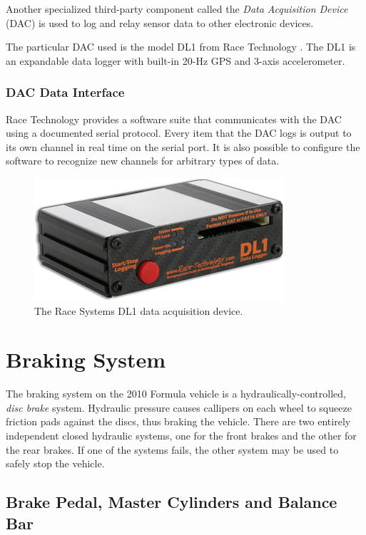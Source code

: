Another specialized third-party component called the \emph{Data Acquisition Device} (DAC) is used to log and relay sensor data to other electronic devices.

The particular DAC used is the model DL1 from Race Technology \cite{DL1Dsheet}. The DL1 is an expandable data logger with built-in 20-Hz GPS and 3-axis accelerometer.

\subsubsection{DAC Data Interface}

Race Technology provides a software suite that communicates with the DAC using a documented serial protocol. Every item that the DAC logs is output to its own channel in real time on the serial port. It is also possible to configure the software to recognize new channels for arbitrary types of data.

\begin{figure}[H]
	\centering
	 	\includegraphics[scale=0.5]{Figures/dl1.png}
    \caption{The Race Systems DL1 data acquisition device.}
    \label{fig:dl1_product}
\end{figure}

\section{Braking System}
\label{sec:brake-overview}

The braking system on the 2010 Formula vehicle is a hydraulically-controlled, \emph{disc brake} system. Hydraulic pressure causes callipers on each wheel to squeeze friction pads against the discs, thus braking the vehicle. There are two entirely independent closed hydraulic systems, one for the front brakes and the other for the rear brakes. If one of the systems fails, the other system may be used to safely stop the vehicle.

\subsection{Brake Pedal, Master Cylinders and Balance Bar}

